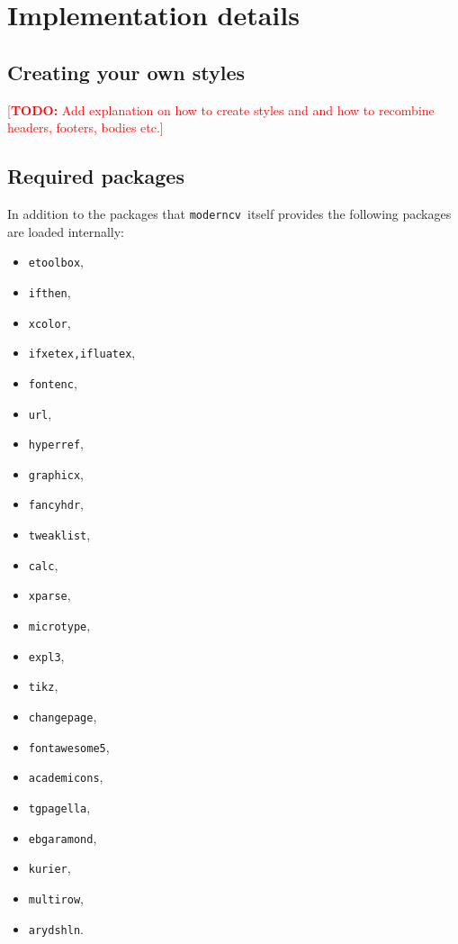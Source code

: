\documentclass[a4paper,11pt]{article}
\newcommand{\todox}[1]{\textcolor{red}{[\textbf{TODO:} #1]}}
\newcommand{\code}[1]{\lstinline!#1!}
\newcommand{\Code}[1]{\lstinline!#1!~} %
\newcommand{\Moderncv}{\Code{moderncv}}
\begin{document}
\section{Implementation details}
\label{section:implementationDetails}

\subsection{Creating your own styles}
\todox{Add explanation on how to create styles and and how to recombine headers, footers, bodies etc.}

\subsection{Required packages}
\label{section:implementationDetails:requiredPackages}
In addition to the packages that \Moderncv itself provides the following packages are loaded internally:

\begin{itemize}
  \item\code{etoolbox}, 
  \item\code{ifthen}, 
  \item\code{xcolor}, 
  \item\code{ifxetex,ifluatex}, 
  \item\code{fontenc}, 
  \item\code{url}, 
  \item\code{hyperref}, 
  \item\code{graphicx}, 
  \item\code{fancyhdr}, 
  \item\code{tweaklist}, 
  \item\code{calc}, 
  \item\code{xparse}, 
  \item\code{microtype}, 
  \item\code{expl3}, 
  \item\code{tikz}, 
  \item\code{changepage}, 
  \item\code{fontawesome5}, 
  \item\code{academicons}, 
  \item\code{tgpagella}, %
  \item\code{ebgaramond}, %
  \item\code{kurier}, 
  \item\code{multirow},
  \item\code{arydshln}. %
\end{itemize}
\end{document}
